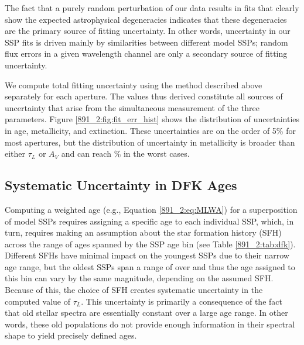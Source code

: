 
 
The fact that a purely random perturbation of our data results in fits
that clearly show the expected astrophysical degeneracies indicates
that these degeneracies are the primary source of fitting
uncertainty. In other words, uncertainty in our SSP fits is driven
mainly by similarities between different model SSPs; random flux
errors in a given wavelength channel are only a secondary source of
fitting uncertainty.



We compute total fitting uncertainty using the method described above
separately for each aperture. The values thus derived constitute all
sources of uncertainty that arise from the simultaneous measurement of
the three parameters. Figure \ref{891_2:fig:fit_err_hist} shows the
distribution of uncertainties in age, metallicity, and
extinction. These uncertainties are on the order of 5\% for most
apertures, but the distribution of uncertainty in metallicity is
broader than either $\tau_L$ or $A_V$ and can reach \% in the
worst cases.



\subsection{Systematic Uncertainty in DFK Ages}
\label{891_2:sec:sys_err}

Computing a weighted age (e.g., Equation \ref{891_2:eq:MLWA}) for a
superposition of model SSPs requires assigning a specific age to each
individual SSP, which, in turn, requires making an assumption about
the star formation history (SFH) across the range of ages spanned by
the SSP age bin (see Table \ref{891_2:tab:dfk}). Different SFHs have
minimal impact on the youngest SSPs due to their narrow age range, but
the oldest SSPs span a range of over  and thus the age
assigned to this bin can vary by the same magnitude, depending on the
assumed SFH. Because of this, the choice of SFH creates systematic
uncertainty in the computed value of $\tau_L$. This uncertainty is
primarily a consequence of the fact that old stellar spectra are
essentially constant over a large age range. In other words, these old
populations do not provide enough information in their spectral shape
to yield precisely defined ages.


